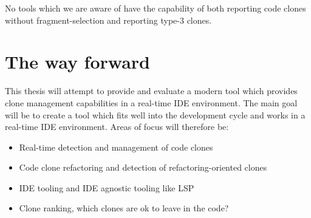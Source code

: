 \documentclass[12pt]{article}
\begin{document}
No tools which we are aware of have the capability of both reporting code clones without
fragment-selection and reporting type-3 clones.

\section{The way forward}

This thesis will attempt to provide and evaluate a modern tool which provides clone management
capabilities in a real-time IDE environment. The main goal will be to create a tool which
fits well into the development cycle and works in a real-time IDE environment. Areas of
focus will therefore be:

\begin{itemize}
    \item Real-time detection and management of code clones
    \item Code clone refactoring and detection of refactoring-oriented clones
    \item IDE tooling and IDE agnostic tooling like LSP\cite{}
    \item Clone ranking, which clones are ok to leave in the code?
\end{itemize}



\end{document}
